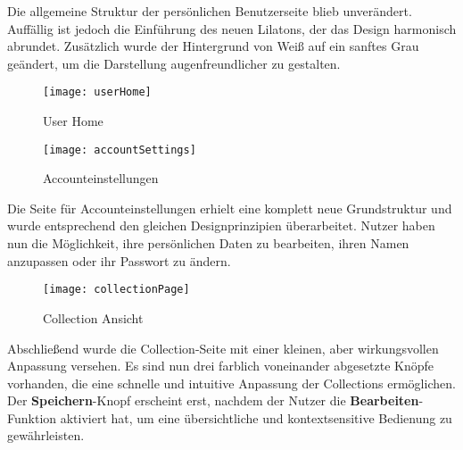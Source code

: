 Die allgemeine Struktur der persönlichen Benutzerseite blieb unverändert.
Auffällig ist jedoch die Einführung des neuen Lilatons, der das Design harmonisch abrundet.
Zusätzlich wurde der Hintergrund von Weiß auf ein sanftes Grau geändert, um die Darstellung augenfreundlicher zu gestalten.



\begin{figure}[h]
    \centering
    \texttt{[image: userHome]}
    \caption{User Home}
    \label{fig:userHome}
\end{figure}

\pagebreak

\begin{figure}[h]
    \centering
    \texttt{[image: accountSettings]}
    \caption{Accounteinstellungen}
    \label{fig:accountSettings}
\end{figure}

Die Seite für Accounteinstellungen erhielt eine komplett neue Grundstruktur und wurde entsprechend den gleichen Designprinzipien überarbeitet.
Nutzer haben nun die Möglichkeit, ihre persönlichen Daten zu bearbeiten, ihren Namen anzupassen oder ihr Passwort zu ändern.

\begin{figure}[h]
    \centering
    \texttt{[image: collectionPage]}
    \caption{Collection Ansicht}
    \label{fig:collectionPage}
\end{figure}

Abschließend wurde die Collection-Seite mit einer kleinen, aber wirkungsvollen Anpassung versehen.
Es sind nun drei farblich voneinander abgesetzte Knöpfe vorhanden, die eine schnelle und intuitive Anpassung der Collections ermöglichen.
Der \textbf{Speichern}-Knopf erscheint erst, nachdem der Nutzer die \textbf{Bearbeiten}-Funktion aktiviert hat, um eine übersichtliche und kontextsensitive Bedienung zu gewährleisten.
